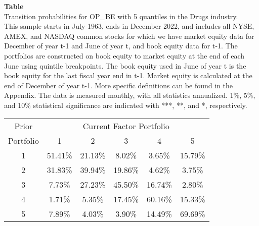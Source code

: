 \begin{table*}[ht!]
\raggedright
{}
\label{tab: transition_probs_OP_BE_Drugs_with_5_quantiles}
\textbf{Table \thetable} \\
Transition probabilities for OP_BE with 5 quantiles in the Drugs industry. \\
\hspace*{1em}This sample starts in July 1963, ends in December 2022, and includes all NYSE, AMEX, and NASDAQ common stocks for which we have market equity data for December of year t-1 and June of year t, and book equity data for t-1. The portfolios are constructed on book equity to market equity at the end of each June using quintile breakpoints.  The book equity used in June of year t is the book equity for the last fiscal year end in t-1.  Market equity is calculated at the end of December of year t-1.  More specific definitions can be found in the Appendix.  The data is measured monthly, with all statistics annualized.  1\%, 5\%, and 10\% statistical significance are indicated with ***, **, and *, respectively. \\
\vspace{0.5em}
\centering
\begin{adjustbox}{max width=\textwidth}
\begin{tabular}{@{}cccccc@{}}
\toprule
Prior & \multicolumn{5}{c}{Current Factor Portfolio} \\
Portfolio & 1 & 2 & 3 & 4 & 5 \\
\midrule
1 & 51.41\% & 21.13\% & 8.02\% & 3.65\% & 15.79\% \\
2 & 31.83\% & 39.94\% & 19.86\% & 4.62\% & 3.75\% \\
3 & 7.73\% & 27.23\% & 45.50\% & 16.74\% & 2.80\% \\
4 & 1.71\% & 5.35\% & 17.45\% & 60.16\% & 15.33\% \\
5 & 7.89\% & 4.03\% & 3.90\% & 14.49\% & 69.69\% \\
\bottomrule
\end{tabular}
\end{adjustbox}
\end{table*}